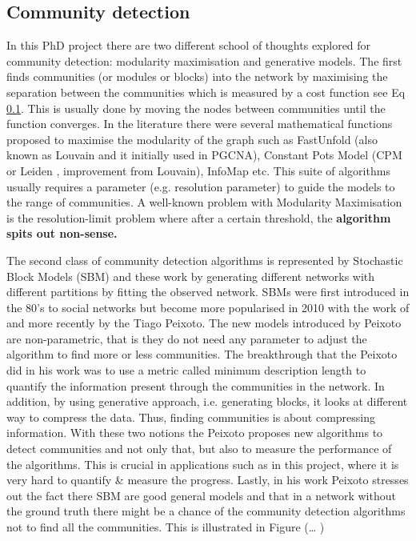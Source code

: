 \subsection{Community detection}

In this PhD project there are two different school of thoughts explored for community detection: modularity maximisation and generative models. The first finds communities (or modules or blocks) into the network by maximising the separation between the communities which is measured by a cost function see Eq \ref{}. This is usually done by moving the nodes between communities until the function converges. In the literature there were several mathematical functions proposed to maximise the modularity of the graph such as FastUnfold \citet{Blondel2008-ik} (also known as Louvain and it initially used in PGCNA), Constant Pots Model (CPM or Leiden \citet{Traag2019-ne}, improvement from Louvain), InfoMap \citet{Rosvall2008-kw} etc. This suite of algorithms usually requires a parameter (e.g. resolution parameter) to guide the models to the range of communities. A well-known problem with Modularity Maximisation is the resolution-limit problem where after a certain threshold, the \textbf{algorithm spits out non-sense. }

The second class of community detection algorithms is represented by Stochastic Block Models (SBM) and these work by generating different networks with different partitions by fitting the observed network. SBMs were first introduced in the 80's to social networks \citet{Holland1983-oo} but become more popularised in 2010 with the work of \citet{Karrer2011-si} and more recently by the Tiago Peixoto. The new models introduced by Peixoto are non-parametric, that is they do not need any parameter to adjust the algorithm to find more or less communities. The breakthrough that the Peixoto did in his work was to use a metric called minimum description length to quantify the information present through the communities in the network. In addition, by using generative approach, i.e. generating blocks, it looks at different way to compress the data. Thus, finding communities is about compressing information. With these two notions the Peixoto proposes new algorithms to detect communities and not only that, but also to measure the performance of the algorithms. This is crucial in applications such as in this project, where it is very hard to quantify \& measure the progress. Lastly, in his work Peixoto stresses out the fact there SBM are good general models and that in a network without the ground truth there might be a chance of the community detection algorithms not to find all the communities. This is illustrated in Figure (… ) 

